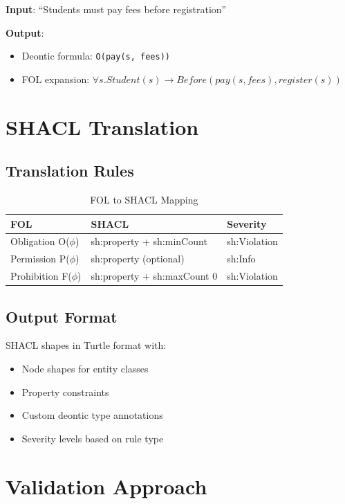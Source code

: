 \textbf{Input}: ``Students must pay fees before registration''

\textbf{Output}:
\begin{itemize}
    \item Deontic formula: \texttt{O(pay(s, fees))}
    \item FOL expansion: $\forall s. Student(s) \rightarrow Before(pay(s, fees), register(s))$
\end{itemize}

\section{SHACL Translation}

\subsection{Translation Rules}

\begin{table}[h]
\centering
\caption{FOL to SHACL Mapping}
\begin{tabular}{|l|l|l|}
\hline
\textbf{FOL} & \textbf{SHACL} & \textbf{Severity} \\
\hline
Obligation O($\phi$) & sh:property + sh:minCount & sh:Violation \\
Permission P($\phi$) & sh:property (optional) & sh:Info \\
Prohibition F($\phi$) & sh:property + sh:maxCount 0 & sh:Violation \\
\hline
\end{tabular}
\end{table}

\subsection{Output Format}

SHACL shapes in Turtle format with:
\begin{itemize}
    \item Node shapes for entity classes
    \item Property constraints
    \item Custom deontic type annotations
    \item Severity levels based on rule type
\end{itemize}

\section{Validation Approach}

